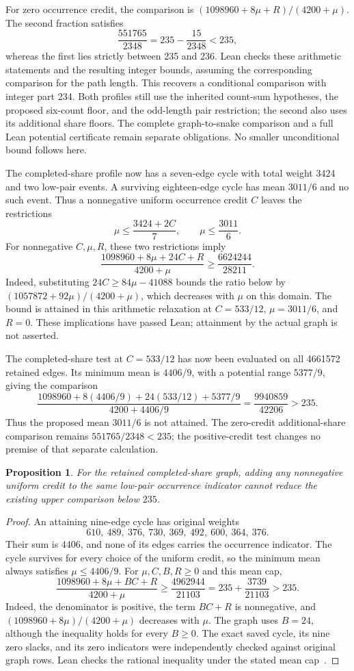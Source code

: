 \documentclass[11pt,a4paper]{article}
\newtheorem{proposition}[theorem]{Proposition}
\theoremstyle{definition}
\theoremstyle{remark}
\begin{document}
For zero occurrence credit, the comparison is
$(1098960+8\mu+R)/(4200+\mu)$. The second fraction satisfies
\[
\frac{551765}{2348}=235-\frac{15}{2348}<235,
\]
whereas the first lies strictly between 235 and 236. Lean checks these
arithmetic statements and the resulting integer bounds, assuming the
corresponding comparison for the path length. This recovers a conditional
comparison with integer part 234. Both profiles still use the inherited
count-sum hypotheses, the proposed six-count floor, and the odd-length
pair restriction; the second also uses its additional share floors.
The complete graph-to-snake comparison and a full Lean potential certificate
remain separate obligations. No smaller unconditional bound follows here.

The completed-share profile now has a seven-edge cycle with total weight
3424 and two low-pair events. A surviving eighteen-edge cycle has mean
$3011/6$ and no such event. Thus a nonnegative uniform occurrence credit
$C$ leaves the restrictions
\[
\mu\le\frac{3424+2C}{7},\qquad \mu\le\frac{3011}{6}.
\]
For nonnegative $C,\mu,R$, these two restrictions imply
\[
\frac{1098960+8\mu+24C+R}{4200+\mu}
\ge\frac{6624244}{28211}.
\]
Indeed, substituting $24C\ge84\mu-41088$ bounds the ratio below by
$(1057872+92\mu)/(4200+\mu)$, which decreases with $\mu$ on this domain.
The bound is attained in this arithmetic relaxation at
$C=533/12$, $\mu=3011/6$, and $R=0$. These implications have passed Lean;
attainment by the actual graph is not asserted.

The completed-share test at $C=533/12$ has now been evaluated on all
4661572 retained edges. Its minimum mean is $4406/9$, with a potential
range $5377/9$, giving the comparison
\[
\frac{1098960+8(4406/9)+24(533/12)+5377/9}{4200+4406/9}
=\frac{9940859}{42206}>235.
\]
Thus the proposed mean $3011/6$ is not attained. The zero-credit
additional-share comparison remains $551765/2348<235$; the positive-credit
test changes no premise of that separate calculation.

\begin{proposition}\label{prop:zero-event-nine-cycle}
For the retained completed-share graph, adding any nonnegative uniform
credit to the same low-pair occurrence indicator cannot reduce the existing
upper comparison below $235$.
\end{proposition}
\begin{proof}
An attaining nine-edge cycle has original weights
\[
610,\ 489,\ 376,\ 730,\ 369,\ 492,\ 600,\ 364,\ 376.
\]
Their sum is $4406$, and none of its edges carries the occurrence indicator.
The cycle survives for every choice of the uniform credit, so the minimum
mean always satisfies $\mu\le4406/9$. For $\mu,C,B,R\ge0$ and this mean cap,
\[
\frac{1098960+8\mu+BC+R}{4200+\mu}
\ge\frac{4962944}{21103}
=235+\frac{3739}{21103}>235.
\]
Indeed, the denominator is positive, the term $BC+R$ is nonnegative,
and $(1098960+8\mu)/(4200+\mu)$ decreases with $\mu$.
The graph uses $B=24$, although the inequality holds for every $B\ge0$.
The exact saved cycle, its nine zero slacks, and its zero indicators were
independently checked against original graph rows. Lean checks the rational
inequality under the stated mean cap~\cite{credit142archive}.
\end{proof}
\end{document}

